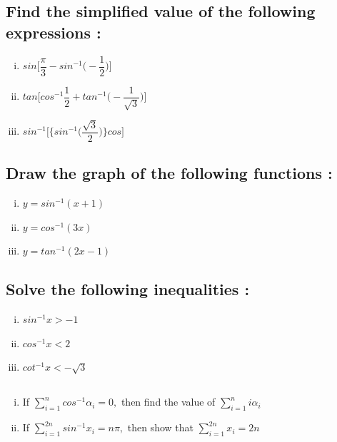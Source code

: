 \documentclass[a4paper,10pt]{article}
\begin{document}
\subsection{Find the simplified value of the following expressions :}
\begin{multicols}{2}
\begin{enumerate}[(i)]
\item $sin\bigg[\dfrac{\pi}{3}-sin^{-1}\bigg(-\dfrac{1}{2}\bigg)\bigg]$
\item
$tan\bigg[cos^{-1}\dfrac{1}{2}+tan^{-1}\bigg(-\dfrac{1}{\sqrt{3}}\bigg)\bigg]$
\item
$sin^{-1}\bigg[\bigg\{sin^{-1}\bigg(\dfrac{\sqrt{3}}{2}\bigg)\bigg\}cos\bigg]$
\end{enumerate}
\end{multicols}
\subsection{Draw the graph of the following functions :}
\begin{multicols}{2}
\begin{enumerate}[(i)]
\item $y = sin^{-1}(x+1)$
\item $y = cos^{-1}(3x)$
\item $y = tan^{-1}(2x-1)$
\end{enumerate}
\end{multicols}
\subsection{Solve the following inequalities :}
\begin{multicols}{2}
\begin{enumerate}[(i)]
\item $sin^{-1} x > - 1$
\item $cos^{-1} x < 2$
\item $cot^{-1} x < -\sqrt{3}$
\end{enumerate}
\end{multicols}
\subsection{}
\begin{enumerate}[(i)]
\vspace{3mm}
\item If $\sum_{i=1}^{n} cos^{-1} \alpha_i = 0,$ then find the value of
$\sum_{i=1}^{n} i \alpha_i$
\vspace{5mm}
\item If $\sum_{i=1}^{2n}sin^{-1} x_i = n\pi,$ then show that
$\sum_{i=1}^{2n} x_i = 2n$
\end{enumerate}
\end{document}
